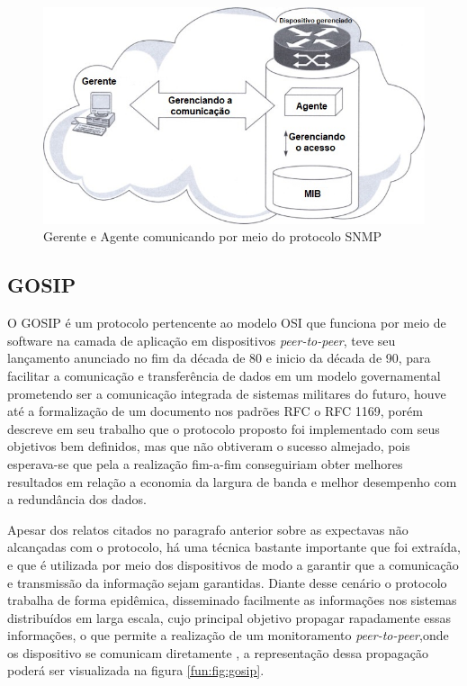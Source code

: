 \begin{figure}[h!]
	\begin{center}
	\includegraphics[scale = 0.90]{img/SNMP-Execution.jpg}
		\caption{Gerente e Agente comunicando por meio do protocolo SNMP\cite{nadeau2003mpls}}
		\label{fun:fig:snmpexecution}
	\end{center}
\end{figure}

\subsection{GOSIP}

O \acrshort{GOSIP} é um protocolo pertencente ao modelo \acrshort{OSI} que funciona por meio de software na camada de aplicação em dispositivos \textit{peer-to-peer}, teve seu lançamento anunciado no fim da década de 80 e inicio da década de 90, para facilitar a comunicação e transferência de dados em um modelo governamental prometendo ser a comunicação integrada de sistemas militares do futuro, houve até a formalização de um documento nos padrões \acrshort{RFC} o RFC 1169\cite{mankin1991towards}, porém \cite{harris1992tactical} descreve em seu trabalho que o protocolo proposto foi implementado com seus objetivos bem definidos, mas que não obtiveram o sucesso almejado, pois esperava-se que pela a realização fim-a-fim conseguiriam obter melhores resultados em relação a economia da largura de banda e melhor desempenho com a redundância dos dados.

Apesar dos relatos citados no paragrafo anterior sobre as expectavas não alcançadas com o protocolo, há uma técnica bastante importante que foi extraída, e que é utilizada por meio dos dispositivos de modo a garantir que a comunicação e transmissão da informação sejam garantidas. Diante desse cenário o protocolo trabalha de forma epidêmica, disseminado facilmente as informações nos sistemas distribuídos em larga escala, cujo principal objetivo propagar rapadamente essas informações, o que permite a realização de um monitoramento \textit{peer-to-peer},onde os dispositivo se comunicam diretamente \cite{tanenbaum2007distributed}, a representação dessa propagação poderá ser visualizada na figura \ref{fun:fig:gosip}. 

